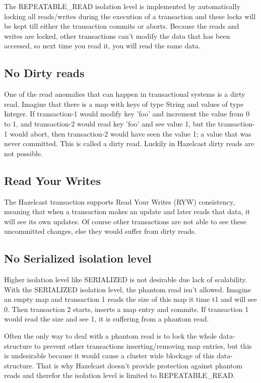 The REPEATABLE\_READ isolation level is implemented by automatically locking all reads/writes during the execution of a transaction and these locks will be kept till either the transaction commits or aborts. Because the reads and writes are locked, other transactions can't modify the data that has been accessed, so next time you read it, you will read the same data.

\subsection*{No Dirty reads}
One of the read anomalies that can happen in transactional systems is a dirty read. Imagine that there is a map with keys of type String and values of type Integer. If transaction-1 would modify key 'foo' and increment the value from 0 to 1, and transaction-2 would read key 'foo' and see value 1, but the transaction-1 would abort, then transaction-2 would have seen the value 1; a value that was never committed. This is called a dirty read. Luckily in Hazelcast dirty reads are not possible.

\subsection*{Read Your Writes}
The Hazelcast transaction supports Read Your Writes (RYW) consistency, meaning that when a transaction makes an update and later reads that data, it will see its own updates. Of course other transactions are not able to see these uncommitted changes, else they would suffer from dirty reads.

\subsection*{No Serialized isolation level}
Higher isolation level like SERIALIZED is not desirable due lack of scalability. With the SERIALIZED isolation level, the phantom read isn't allowed. Imagine an empty map and transaction 1 reads the size of this map it time t1 and will see 0. Then transaction 2 starts, inserts a map entry and commits. If transaction 1 would read the size and see 1, it is suffering from a phantom read. 

Often the only way to deal with a phantom read is to lock the whole data-structure to prevent other transactions inserting/removing map entries, but this is undesirable because it would cause a cluster wide blockage of this data-structure. That is why Hazelcast doesn't provide protection against phantom reads and therefor the isolation level is limited to REPEATABLE\_READ.

